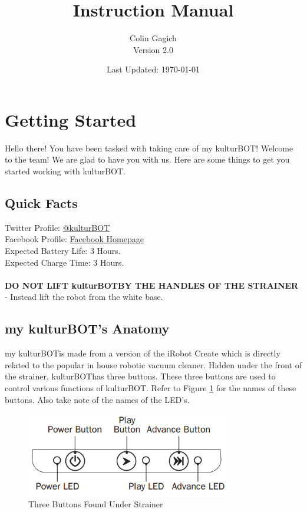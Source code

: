 \documentclass[]{article}
\title{\kbspace Instruction Manual}
\author{Colin Gagich \\ \textnormal Version 2.0}
\date{Last Updated: \today}
\newcommand{\kb}{kulturBOT}
\newcommand{\kbspace}{\kb \space}
\newcommand{\mykb}{my \kb}
\newcommand{\mykbspace}{\mykb \space}
\begin{document}
\maketitle

\newpage

\tableofcontents
\newpage

\section{Getting Started}
Hello there! You have been tasked with taking care of \mykb! Welcome to the team! We are glad to have you with us. Here are some things to get you started working with \kb.

\subsection{Quick Facts}

Twitter Profile: \href{https://twitter.com/kulturBOT}{@kulturBOT} \\
Facebook Profile: \href{https://www.facebook.com/thekulturbot}{Facebook Homepage}\\
Expected Battery Life: 3 Hours.\\
Expected Charge Time: 3 Hours.\\ \\
\textbf{DO NOT LIFT \kbspace BY THE HANDLES OF THE STRAINER} - Instead lift the robot from the white base.

\subsection{\mykb 's Anatomy}

\mykbspace is made from a version of the iRobot Create which is directly related to the popular in house robotic vacuum cleaner. Hidden under the front of the strainer, \kbspace has three buttons. These three buttons are used to control various functions of \kb. Refer to Figure \ref{3button} for the names of these buttons. Also take note of the names of the LED's.

	\begin{figure}[h!]
		\centering
	    \includegraphics[width=0.8\textwidth]{img/3button.png}
	    \caption{Three Buttons Found Under Strainer}
	    \label{3button}
	\end{figure}
\end{document}
